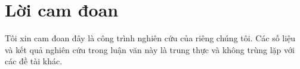 \chapter*{Lời cam đoan}
\label{reassurances}

Tôi xin cam đoan đây là công trình nghiên cứu của riêng chúng tôi. Các số liệu và kết quả nghiên cứu trong luận văn này là trung thực và không trùng lặp với các đề tài khác.
